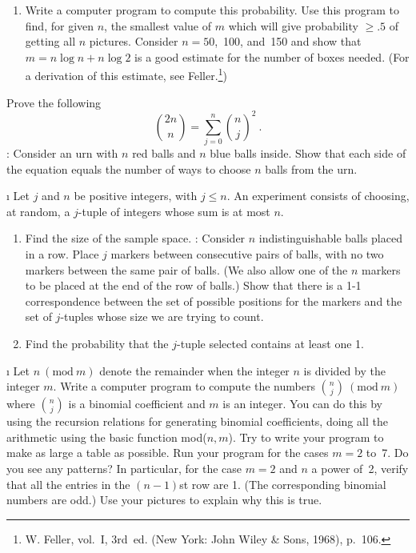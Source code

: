 \begin{LJSItem}
\begin{enumerate}
\item Write a computer program to compute this probability.  Use this program to find,
for given $n$, the smallest value of $m$ which will give probability $\geq .5$ of
getting all $n$ pictures.  Consider $n = 50$,~100, and~150 and show that $m = n\log n + 
n \log 2$ is a good estimate for the number of boxes needed.  (For a derivation of this estimate, see
Feller.\footnote{W. Feller,  vol.~I,
3rd~ed. (New York: John Wiley \& Sons, 1968), p.~106.})
\end{enumerate}

\istar\label{exer 3.2.35} Prove the following 
$$
 {2n \choose n} = \sum_{j = 0}^n { n \choose j}^2\ .
$$ : Consider an urn with $n$ red balls and $n$ blue balls inside.  Show
that each side of the equation equals the number of ways to choose $n$ balls from the
urn.

\i\label{exer 3.2.35.5} Let $j$ and $n$ be positive integers, with $j \le n$.  An
experiment consists of choosing, at random, a $j$-tuple of  integers
whose sum is at most $n$.
\begin{enumerate}
\item Find the size of the sample space.  :  Consider $n$ indistinguishable
balls placed in a row.  Place $j$ markers between consecutive pairs of balls, with no
two markers between the same pair of balls.  (We also allow one of the $n$ markers to be 
placed at the end of the row of balls.)  Show that there is a 1-1 correspondence
between the set of possible positions for the markers and the set of $j$-tuples whose
size we are trying to count.
\item Find the probability that the $j$-tuple selected contains at least one 1.
\end{enumerate}

\i\label{exer 3.2.36} Let $n\ (\mbox{mod}\ m)$ denote the remainder when the integer
$n$ is divided by the integer $m$.  Write a computer program to compute the numbers
${n \choose j}\ (\mbox{mod}\ m)$ where ${n \choose j}$ is a binomial coefficient  and
$m$ is an integer.  You can do this by using the recursion relations for generating
binomial coefficients, doing all the arithmetic using the basic function mod($n,m$). 
Try to write your program to make as large a table as possible.  Run your program for
the cases $m = 2$ to~7.  Do you see any patterns?  In particular, for the case $m = 2$
and $n$ a power of~2, verify that all the entries in the $(n - 1)$st row are 1.  (The
corresponding binomial numbers are odd.)  Use your pictures to explain why this is
true.


\end{LJSItem}
